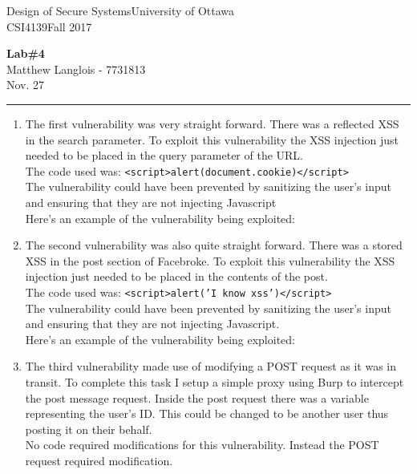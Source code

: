 \documentclass[fleqn, 12pt]{article}
\newcommand{\university}{University of Ottawa}
\newcommand{\name}{Matthew Langlois}
\newcommand{\studentNumber}{7731813}
\newcommand{\semester}{Fall 2017}
\newcommand{\assignmentType}{Lab}
\newcommand{\assignmentNumber}{4}
\newcommand{\dueDate}{Nov. 27}
\newcommand{\courseCode}{CSI4139}
\newcommand{\courseTitle}{Design of Secure Systems}
\newcommand{\essayTitle}{<Title>} %
\newcommand{\essaySubtitle}{<subtitle>} %
\newcommand{\essayAbstract}{} %
\newcommand{\code}[2]{\colorbox{codegray}{\texttt{#2}}}
\newcommand{\beginassignemnt}{
    \newlength\tindent
    \setlength{\tindent}{\parindent}
    \setlength{\parindent}{0pt}

    \thispagestyle{assignment}
    \noindent
    \courseTitle \hfill \university\\
    \courseCode \hfill \semester
    \begin{center}
        \textbf{\assignmentType\text{ }\#\assignmentNumber}\\
        \name \hspace{1pt} - \studentNumber\\
        \dueDate\\
    \end{center}
    \vspace{6pt}
    \hrule
    \vspace{1.5\headsep}
}
\newcommand{\beginessay}{
    \nocite{*}

    \pagestyle{frontmatter}
    \pagenumbering{roman}

    \begin{center}
        \normalsize
        \textsc{\university}\\[5cm]
        \LARGE \textbf{\MakeUppercase{\essayTitle}}\\[0.5cm]
        \large \text{ }\essaySubtitle\text{ }\\[10cm] %
        \normalsize
        \textsc{\name}\\
        \textsc{\studentNumber}\\
        \textsc{\courseCode}\\
        \textsc{\semester}\\
        \textsc{\dueDate}
    \end{center}
    \thispagestyle{empty}

    \newpage
    \tableofcontents
    \newpage

    \iftotalfigures
        \addcontentsline{toc}{section}{\listfigurename}
        \listoffigures
    \fi
    \iftotaltables
        \addcontentsline{toc}{section}{\listtablename}
        \listoftables
    \fi

    \ifdefempty{\essayAbstract}{}{
        \newpage
        \addcontentsline{toc}{section}{Abstract}
        \begin{abstract}
            \essayAbstract
        \end{abstract}

    }
    \label{EndFrontMatter}
    \newpage

    \pagenumbering{arabic}
    \pagestyle{body}
}
\begin{document}
\beginassignemnt

\begin{enumerate}
    \item
        The first vulnerability was very straight forward. There was a reflected XSS in the search parameter. To exploit this vulnerability the XSS injection just needed to be placed in the query parameter of the URL.\\

        The code used was: \code{html}{<script>alert(document.cookie)</script>}\\

        The vulnerability could have been prevented by sanitizing the user's input and ensuring that they are not injecting Javascript\\

        Here's an example of the vulnerability being exploited:


    \item
        The second vulnerability was also quite straight forward. There was a stored XSS in the post section of Facebroke. To exploit this vulnerability the XSS injection just needed to be placed in the contents of the post.\\

        The code used was: \code{html}{<script>alert('I know xss')</script>}\\

        The vulnerability could have been prevented by sanitizing the user's input and ensuring that they are not injecting Javascript.\\

        Here's an example of the vulnerability being exploited:


    \item
        The third vulnerability made use of modifying a POST request as it was in transit. To complete this task I setup a simple proxy using Burp to intercept the post message request. Inside the post request there was a variable representing the user's ID. This could be changed to be another user thus posting it on their behalf.\\

        No code required modifications for this vulnerability. Instead the POST request required modification.\\


\end{enumerate}
\end{document}
